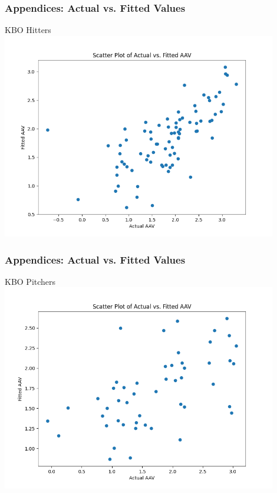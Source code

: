 \documentclass[9pt]{beamer}
\begin{document}
\begin{frame}
    \frametitle{Appendices: Actual vs. Fitted Values}
    \begin{block}{KBO Hitters}
        \centering
        \includegraphics[width=0.9\textwidth,keepaspectratio]{images/kbo_hitters_fitted.png}
    \end{block}
\end{frame}

\begin{frame}
    \frametitle{Appendices: Actual vs. Fitted Values}
    \begin{block}{KBO Pitchers}
        \centering
        \includegraphics[width=0.9\textwidth,keepaspectratio]{images/kbo_pitchers_fitted.png}
    \end{block}
\end{frame}
\end{document}
